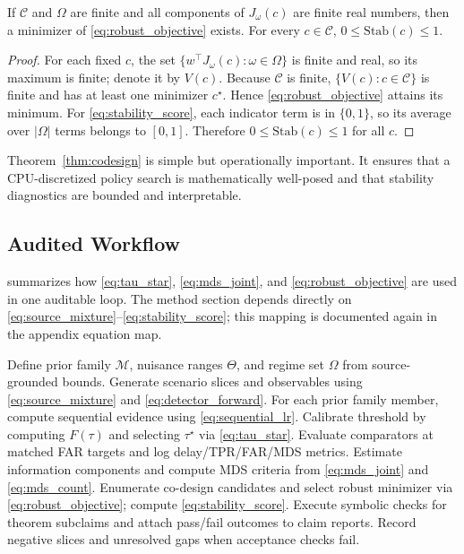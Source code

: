 \begin{theorem}\label{thm:codesign}
If $\mathcal{C}$ and $\Omega$ are finite and all components of $J_\omega(c)$ are finite real numbers, then a minimizer of \eqref{eq:robust_objective} exists. For every $c\in\mathcal{C}$, $0\le\mathrm{Stab}(c)\le 1$.
\end{theorem}
\begin{proof}
For each fixed $c$, the set $\{w^\top J_\omega(c):\omega\in\Omega\}$ is finite and real, so its maximum is finite; denote it by $V(c)$. Because $\mathcal{C}$ is finite, $\{V(c):c\in\mathcal{C}\}$ is finite and has at least one minimizer $c^\star$. Hence \eqref{eq:robust_objective} attains its minimum. For \eqref{eq:stability_score}, each indicator term is in $\{0,1\}$, so its average over $|\Omega|$ terms belongs to $[0,1]$. Therefore $0\le\mathrm{Stab}(c)\le 1$ for all $c$.
\end{proof}

Theorem~\ref{thm:codesign} is simple but operationally important. It ensures that a CPU-discretized policy search is mathematically well-posed and that stability diagnostics are bounded and interpretable.

\subsection{Audited Workflow}
 summarizes how \eqref{eq:tau_star}, \eqref{eq:mds_joint}, and \eqref{eq:robust_objective} are used in one auditable loop. The method section depends directly on \eqref{eq:source_mixture}--\eqref{eq:stability_score}; this mapping is documented again in the appendix equation map.

\begin{algorithm}[t]
\caption{Contradiction-Aware Robust Monitoring Workflow}
\label{alg:workflow}
\begin{algorithmic}[1]
\STATE Define prior family $\mathcal{M}$, nuisance ranges $\Theta$, and regime set $\Omega$ from source-grounded bounds.
\STATE Generate scenario slices and observables using \eqref{eq:source_mixture} and \eqref{eq:detector_forward}.
\STATE For each prior family member, compute sequential evidence using \eqref{eq:sequential_lr}.
\STATE Calibrate threshold by computing $F(\tau)$ and selecting $\tau^\star$ via \eqref{eq:tau_star}.
\STATE Evaluate comparators at matched FAR targets and log delay/TPR/FAR/MDS metrics.
\STATE Estimate information components and compute MDS criteria from \eqref{eq:mds_joint} and \eqref{eq:mds_count}.
\STATE Enumerate co-design candidates and select robust minimizer via \eqref{eq:robust_objective}; compute \eqref{eq:stability_score}.
\STATE Execute symbolic checks for theorem subclaims and attach pass/fail outcomes to claim reports.
\STATE Record negative slices and unresolved gaps when acceptance checks fail.
\end{algorithmic}
\end{algorithm}

